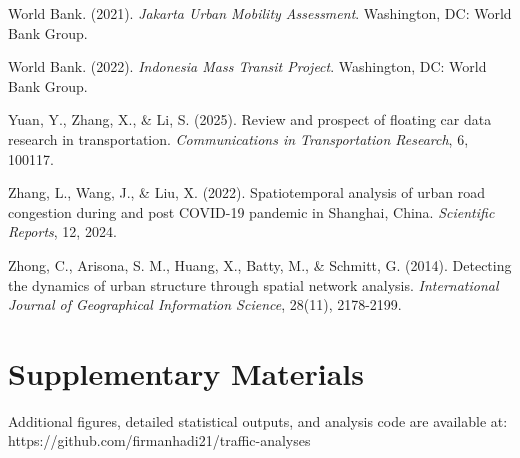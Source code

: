 \documentclass[12pt,a4paper]{article}
\begin{document}
World Bank. (2021). \emph{Jakarta Urban Mobility Assessment}. Washington, DC: World Bank Group.

World Bank. (2022). \emph{Indonesia Mass Transit Project}. Washington, DC: World Bank Group.

Yuan, Y., Zhang, X., \& Li, S. (2025). Review and prospect of floating car data research in transportation. \emph{Communications in Transportation Research}, 6, 100117.

Zhang, L., Wang, J., \& Liu, X. (2022). Spatiotemporal analysis of urban road congestion during and post COVID-19 pandemic in Shanghai, China. \emph{Scientific Reports}, 12, 2024.

Zhong, C., Arisona, S. M., Huang, X., Batty, M., \& Schmitt, G. (2014). Detecting the dynamics of urban structure through spatial network analysis. \emph{International Journal of Geographical Information Science}, 28(11), 2178-2199.



\section*{Supplementary Materials}

Additional figures, detailed statistical outputs, and analysis code are available at: https://github.com/firmanhadi21/traffic-analyses
\end{document}
